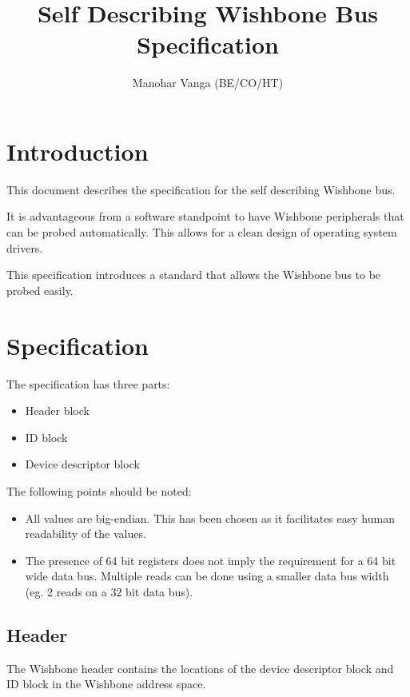 \documentclass{article}
\title{Self Describing Wishbone Bus Specification}
\author{Manohar Vanga (BE/CO/HT)}
\begin{document}
\maketitle

\tableofcontents

\pagebreak

\section{Introduction}

This document describes the specification for the self describing Wishbone
bus.

It is advantageous from a software standpoint to have Wishbone peripherals
that can be probed automatically. This allows for a clean design of operating
system drivers.

This specification introduces a standard that allows the Wishbone bus to be
probed easily.

\pagebreak

\section{Specification}

The specification has three parts:

\begin{itemize}
\item Header block
\item ID block
\item Device descriptor block
\end{itemize}

The following points should be noted:

\begin{itemize}
\item All values are big-endian. This has been chosen as it facilitates easy
human readability of the values.
\item The presence of 64 bit registers does not imply the requirement for a
64 bit wide data bus. Multiple reads can be done using a smaller data
bus width (eg. 2 reads on a 32 bit data bus).
\end{itemize}

\subsection{Header}

The Wishbone header contains the locations of the device descriptor block and 
ID block in the Wishbone address space.
\end{document}
